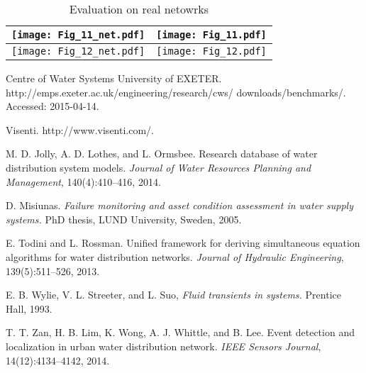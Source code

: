 \documentclass[twocolumn]{autart}
\begin{document}
\newpage
\begin{table*}[tp]
\caption*{Evaluation on real netowrks}
\centering
\begin{tabular}{|c|c|}
 \hline
\texttt{[image: Fig\_11\_net.pdf]}&\texttt{[image: Fig\_11.pdf]}\\
\hline
\texttt{[image: Fig\_12\_net.pdf]}&\texttt{[image: Fig\_12.pdf]}\\
\hline
\end{tabular}
\label{tab:gt}
\end{table*}

\begin{thebibliography}{1}

Centre of Water Systems University of EXETER. 
http://emps.exeter.ac.uk/engineering/research/cws/
downloads/benchmarks/. Accessed: 2015-04-14.


Visenti. http://www.visenti.com/.

M. D. Jolly, A. D. Lothes, and L. Ormsbee. Research database of water distribution system models. \emph{Journal of Water Resources Planning and Management}, 140(4):410--416, 2014.

D. Misiunas. \emph{Failure monitoring and asset condition assessment in water supply systems.} PhD thesis, LUND University, Sweden, 2005.

E. Todini and L. Rossman. Unified framework for deriving simultaneous equation algorithms for water distribution networks. \emph{Journal of Hydraulic Engineering}, 139(5):511--526, 2013.

E. B. Wylie, V. L. Streeter, and L. Suo, \emph{Fluid transients in systems.} Prentice Hall, 1993.

T. T. Zan, H. B. Lim, K. Wong, A. J. Whittle, and B. Lee. Event detection and localization in urban water distribution network. \emph{IEEE Sensors Journal}, 14(12):4134--4142, 2014.

 
 \end{thebibliography}
\end{document}
